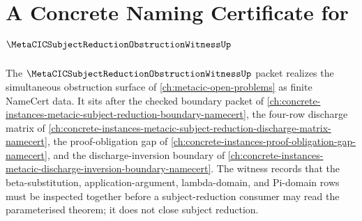 \chapter{A Concrete Naming Certificate for $\MetaCICSubjectReductionObstructionWitnessUp$}
\label{ch:concrete-instances-metacic-subject-reduction-obstruction-witness-namecert}

The $\MetaCICSubjectReductionObstructionWitnessUp$ packet realizes the simultaneous obstruction surface of \autoref{ch:metacic-open-problems} as finite NameCert data. It sits after the checked boundary packet of \autoref{ch:concrete-instances-metacic-subject-reduction-boundary-namecert}, the four-row discharge matrix of \autoref{ch:concrete-instances-metacic-subject-reduction-discharge-matrix-namecert}, the proof-obligation gap of \autoref{ch:concrete-instances-proof-obligation-gap-namecert}, and the discharge-inversion boundary of \autoref{ch:concrete-instances-metacic-discharge-inversion-boundary-namecert}. The witness records that the beta-substitution, application-argument, lambda-domain, and Pi-domain rows must be inspected together before a subject-reduction consumer may read the parameterised theorem; it does not close subject reduction.

